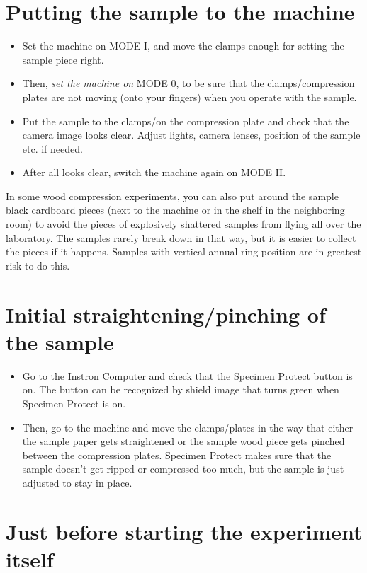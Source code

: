 \documentclass[a4paper]{article}
\begin{document}
\section{Putting the sample to the machine}

\begin{itemize}
  \item Set the machine on \textsf{MODE I}, and move the clamps enough for setting the sample piece right.
  \item Then, \textit{set the machine on} \textsf{MODE 0}, to be sure that the clamps/compression plates are not moving (onto your fingers) when you operate with the sample.
  \item Put the sample to the clamps/on the compression plate and check that the camera image looks clear. Adjust lights, camera lenses, position of the sample etc. if needed.
  \item After all looks clear, switch the machine again on \textsf{MODE II}.
\end{itemize}

In some wood compression experiments, you can also put around the sample 
black cardboard pieces (next to the machine or in the shelf in the neighboring 
room) to avoid the pieces of explosively shattered samples from flying all 
over the laboratory. The samples rarely break down in that way, but it is 
easier to collect the pieces if it happens. Samples with vertical annual ring 
position are in greatest risk to do this.

\section{Initial straightening/pinching of the sample} 

\begin{itemize}
  \item Go to the Instron Computer and check that the Specimen Protect button is on. The button can be recognized by shield image that turns green when Specimen Protect is on.
  \item Then, go to the machine and move the clamps/plates in the way that either the sample paper gets straightened or the sample wood piece gets pinched between the compression plates. Specimen Protect makes sure that the sample doesn't get ripped or compressed too much, but the sample is just adjusted to stay in place.
\end{itemize}

\section{Just before starting the experiment itself} 
\end{document}
